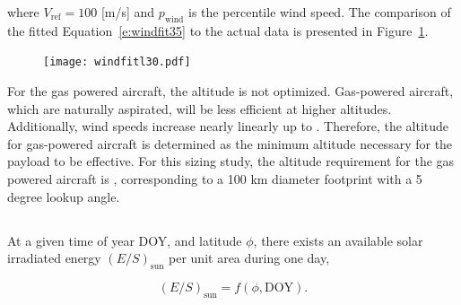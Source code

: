 where $V_{\text{ref}} = 100$ [m/s] and $p_{\text{wind}}$ is the percentile wind speed. The comparison of the fitted Equation~\eqref{e:windfit35} to the actual data is presented in Figure~\ref{f:windfitl35}. 

\begin{figure}[H]
	\begin{center}
	\DIFdelbeginFL %
\DIFdelendFL \DIFaddbeginFL \texttt{[image: windfitl30.pdf]}
    \DIFaddendFL \caption{\DIFdelbeginFL \textbf{}%
\DIFdelendFL \DIFaddbeginFL \textbf{}\DIFaddendFL }
	\label{f:windfitl35}
	\end{center}
\end{figure}

For the gas powered aircraft, the altitude is not optimized.  
Gas-powered aircraft, which are naturally aspirated, will be less efficient at higher altitudes.  
Additionally, wind speeds increase nearly linearly up to \DIFdelbegin {}\DIFdelend \DIFaddbegin {}\DIFaddend .  
Therefore, the altitude for gas-powered aircraft is determined as the minimum altitude necessary for the payload to be effective.\cite{orion}
For this sizing study, the altitude requirement for the gas powered aircraft is \DIFdelbegin {}\DIFdelend \DIFaddbegin {}\DIFaddend , corresponding to a 100 km diameter footprint with a 5 degree lookup angle. 

\DIFdelbegin \subsection{}
\addtocounter{subsection}{-1}%
\DIFdelend \DIFaddbegin \subsubsection{}
\DIFaddend 

At a given time of year DOY, and latitude $\phi$, there exists an available solar irradiated energy $(E/S)_{\text{sun}}$ per unit area during one day,

\begin{equation}
    \label{e:solarfunc}
    (E/S)_{\text{sun}} = f(\phi, \text{DOY}).
\end{equation}

